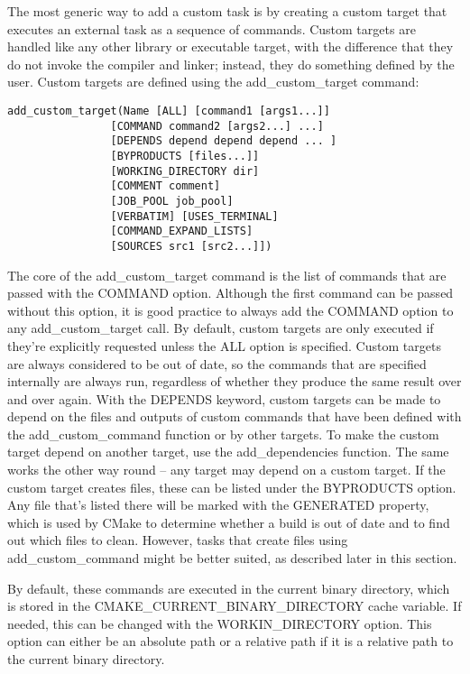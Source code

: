 


The most generic way to add a custom task is by creating a custom target that executes an external task as a sequence of commands. Custom targets are handled like any other library or executable target, with the difference that they do not invoke the compiler and linker; instead, they do something defined by the user. Custom targets are defined using the add\_custom\_target command:

\begin{lstlisting}[style=styleCMake]
add_custom_target(Name [ALL] [command1 [args1...]]
				[COMMAND command2 [args2...] ...]
				[DEPENDS depend depend depend ... ]
				[BYPRODUCTS [files...]]
				[WORKING_DIRECTORY dir]
				[COMMENT comment]
				[JOB_POOL job_pool]
				[VERBATIM] [USES_TERMINAL]
				[COMMAND_EXPAND_LISTS]
				[SOURCES src1 [src2...]])
\end{lstlisting}

The core of the add\_custom\_target command is the list of commands that are passed with the COMMAND option. Although the first command can be passed without this option, it is good practice to always add the COMMAND option to any add\_custom\_target call. By default, custom targets are only executed if they're explicitly requested unless the ALL option is specified. Custom targets are always considered to be out of date, so the commands that are specified internally are always run, regardless of whether they produce the same result over and over again. With the DEPENDS keyword, custom targets can be made to depend on the files and outputs of custom commands that have been defined with the add\_custom\_command function or by other targets. To make the custom target depend on another target, use the add\_dependencies function. The same works the other way round – any target may depend on a custom target. If the custom target creates files, these can be listed under the BYPRODUCTS option. Any file that's listed there will be marked with the GENERATED property, which is used by CMake to determine whether a build is out of date and to find out which files to clean. However, tasks that create files using add\_custom\_command might be better suited, as described later in this section.

By default, these commands are executed in the current binary directory, which is stored in the CMAKE\_CURRENT\_BINARY\_DIRECTORY cache variable. If needed, this can be changed with the WORKIN\_DIRECTORY option. This option can either be an absolute path or a relative path if it is a relative path to the current binary directory.

